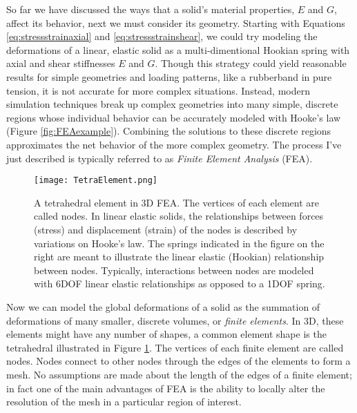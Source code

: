 {So far we have discussed the ways that a solid's material properties, $E$ and $G$, affect its behavior, next we must consider its geometry.  Starting with Equations \ref{eq:stressstrainaxial} and  \ref{eq:stressstrainshear}, we could try modeling the deformations of a linear, elastic solid as a multi-dimentional Hookian spring with axial and shear stiffnesses $E$ and $G$.  Though this strategy could yield reasonable results for simple geometries and loading patterns, like a rubberband in pure tension, it is not accurate for more complex situations.  Instead, modern simulation techniques break up complex geometries into many simple, discrete regions whose individual behavior can be accurately modeled with Hooke's law (Figure \ref{fig:FEAexample}).  Combining the solutions to these discrete regions approximates the net behavior of the more complex geometry.  The process I've just described is typically referred to as \textit{Finite Element Analysis} (FEA).\\

\begin{figure}
  \texttt{[image: TetraElement.png]}
  \caption{A tetrahedral element in 3D FEA.  The vertices of each element are called nodes.  In linear elastic solids, the relationships between forces (stress) and displacement (strain) of the nodes is described by variations on Hooke's law.  The springs indicated in the figure on the right are meant to illustrate the linear elastic (Hookian) relationship between nodes.  Typically, interactions between nodes are modeled with 6DOF linear elastic relationships as opposed to a 1DOF spring.}
  \label{fig:TetraElement}
\end{figure}

Now we can model the global deformations of a solid as the summation of deformations of many smaller, discrete volumes, or \textit{finite elements}.  In 3D, these elements might have any number of shapes, a common element shape is the tetrahedral illustrated in Figure \ref{fig:TetraElement}.  The vertices of each finite element are called nodes.  Nodes connect to other nodes through the edges of the elements to form a mesh.  No assumptions are made about the length of the edges of a finite element; in fact one of the main advantages of FEA is the ability to locally alter the resolution of the mesh in a particular region of interest.\\

}
